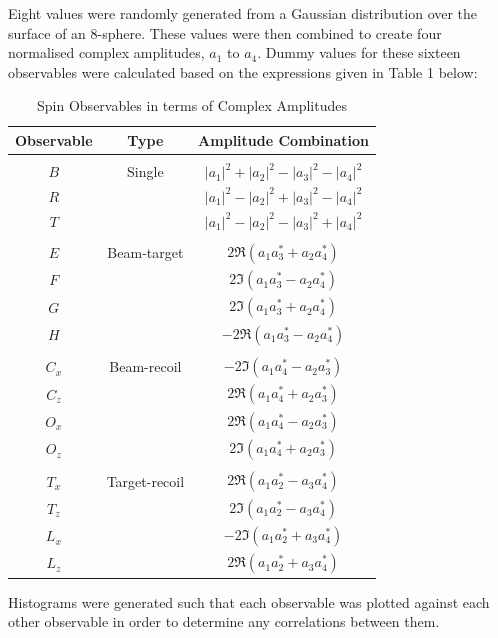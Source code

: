 \documentclass[a4paper,12pt]{article}
\begin{document}
\newline
Eight values were randomly generated from a Gaussian distribution over the surface of an 8-sphere.  These values were then combined to create four normalised complex amplitudes, $a_{1}$ to $a_{4}$.  Dummy values for these sixteen observables were calculated based on the expressions given in Table 1 below:
\newline
  \begin{center}
  \begin{table}[!h]
  \caption{Spin Observables in terms of Complex Amplitudes\cite{info}}
  \centering
  \begin{tabular}{c  c  c}
  \hline \hline
  Observable & Type & Amplitude Combination \\ [0.5ex]
  \hline \\
  $B$ & Single & $|a_{1}|^{2} + |a_{2}|^{2} - |a_{3}|^{2} - |a_{4}|^{2}$ \\
  $R$ & & $|a_{1}|^{2} - |a_{2}|^{2} + |a_{3}|^{2} - |a_{4}|^{2}$ \\
  $T$ & & $|a_{1}|^{2} - |a_{2}|^{2} - |a_{3}|^{2} + |a_{4}|^{2}$ \\ \\
  $E$ & Beam-target & $2\Re(a_{1}a_{3}^{*} + a_{2}a_{4}^{*})$ \\
  $F$ & & $2\Im(a_{1}a_{3}^{*} - a_{2}a_{4}^{*})$ \\ 
  $G$ & & $2\Im(a_{1}a_{3}^{*} + a_{2}a_{4}^{*})$ \\ 
  $H$ & & $-2\Re(a_{1}a_{3}^{*} - a_{2}a_{4}^{*})$ \\ \\
  $C_{x}$ & Beam-recoil & $-2\Im(a_{1}a_{4}^{*} - a_{2}a_{3}^{*})$ \\
  $C_{z}$ & & $2\Re(a_{1}a_{4}^{*} + a_{2}a_{3}^{*})$ \\
  $O_{x}$ & & $2\Re(a_{1}a_{4}^{*} - a_{2}a_{3}^{*})$ \\
  $O_{z}$ & & $2\Im(a_{1}a_{4}^{*} + a_{2}a_{3}^{*})$ \\ \\
  $T_{x}$ & Target-recoil & $2\Re(a_{1}a_{2}^{*} - a_{3}a_{4}^{*})$ \\
  $T_{z}$ & & $2\Im(a_{1}a_{2}^{*} - a_{3}a_{4}^{*})$ \\
  $L_{x}$ & & $-2\Im(a_{1}a_{2}^{*} + a_{3}a_{4}^{*})$ \\
  $L_{z}$ & & $2\Re(a_{1}a_{2}^{*} + a_{3}a_{4}^{*})$ \\ [1ex]
  \hline
  \end{tabular}

  \end{table}
  \end{center}
\newpage
Histograms were generated such that each observable was plotted against each other observable in order to determine any correlations between them.  
\end{document}
